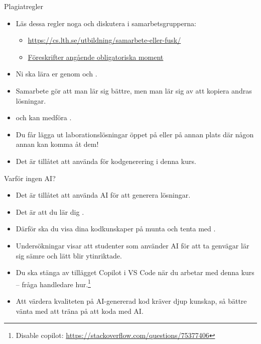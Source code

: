 \begin{SlideExtra}{Plagiatregler}
\begin{itemize}
\item Läs dessa regler noga och diskutera i samarbetsgrupperna:

\begin{itemize}
\footnotesize
\item \url{https://cs.lth.se/utbildning/samarbete-eller-fusk/}
\item \href{https://cs.lth.se/utbildning/foereskrifter-angaaende-obligatoriska-moment/}{Föreskrifter angående obligatoriska moment}
\end{itemize}
\item Ni ska lära er genom  och  .
\item Samarbete gör att man lär sig bättre, men man lär sig  av att kopiera andras lösningar.
\item {} och kan medföra .
\item Du får  lägga ut laborationslösningar öppet på  eller på annan plats där någon annan kan komma åt dem!
\item Det är  tillåtet att använda  för kodgenerering i denna kurs.
\end{itemize}

\end{SlideExtra}

\begin{SlideExtra}{Varför ingen AI?}
\begin{itemize}
\item Det är  tillåtet att använda AI för att generera lösningar. 
\item Det är  att du lär dig .
\item Därför ska du visa dina kodkunskaper på munta och tenta med .
\item Undersökningar visar att studenter som använder AI för att ta genvägar lär sig sämre och lätt blir ytinriktade.
\item Du ska stänga av tillägget Copilot i VS Code  när du arbetar med denna kurs -- fråga handledare hur.\footnote{Disable copilot: \url{https://stackoverflow.com/questions/75377406}}
\item Att värdera kvaliteten på AI-genererad kod kräver djup kunskap, så bättre vänta med att träna på att koda med AI.

\end{itemize}

\end{SlideExtra}

